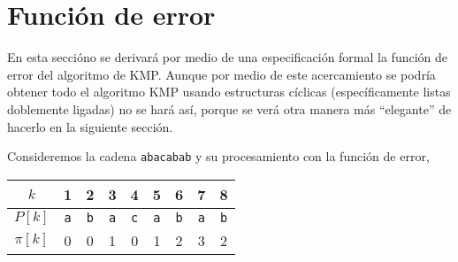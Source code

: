 




\section{Función de error}\label{funcional:funcion_error}
En esta seccióno se derivará por medio de una especificación formal la función de error del
algoritmo de KMP. Aunque por medio de este acercamiento\cite{bird:cyclic} se podría obtener todo
el algoritmo KMP usando estructuras cíclicas (específicamente listas doblemente ligadas) no se
hará así, porque se verá otra manera más ``elegante'' de hacerlo en la siguiente sección.

Consideremos la cadena \texttt{abacabab} y su procesamiento con la función de error,

\begin{table}[h]
\centering
\begin{tabular}{c|c|c|c|c|c|c|c|c|}
\cline{2-9}
$k$      & 1          & 2          & 3          & 4          & 5          & 6          & 7          & 8          \\ \hline
$P[k]$   & \texttt{a} & \texttt{b} & \texttt{a} & \texttt{c} & \texttt{a} & \texttt{b} & \texttt{a} & \texttt{b} \\ \hline
$\pi[k]$ & 0          & 0          & 1          & 0          & 1          & 2          & 3          & 2          \\ \cline{2-9} 
\end{tabular}
\end{table}

